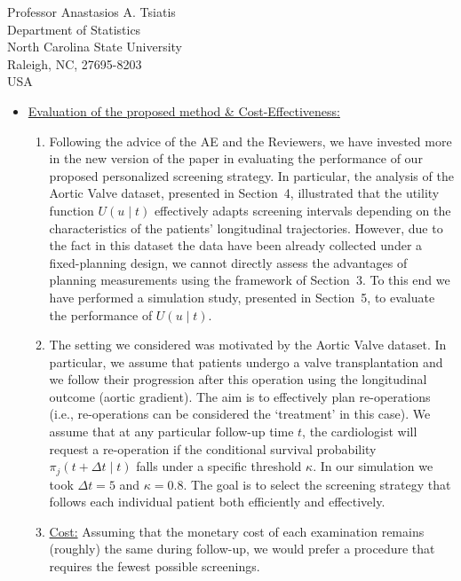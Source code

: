 \documentclass[a4paper, 11pt]{letter}
\begin{document}
\begin{letter}{Professor Anastasios A. Tsiatis\\
Department of Statistics\\
North Carolina State University\\
Raleigh, NC, 27695-8203\\
USA}
\begin{itemize}
\item \underline{Evaluation of the proposed method \& Cost-Effectiveness:}
    \begin{enumerate}
    \item Following the advice of the AE and the Reviewers, we have invested more in the new version of the paper in evaluating the performance of our proposed personalized screening strategy. In particular, the analysis of the Aortic Valve dataset, presented in Section~4, illustrated that the utility function $U(u \mid t)$ effectively adapts screening intervals depending on the characteristics of the patients' longitudinal trajectories. However, due to the fact in this dataset the data have been already collected under a fixed-planning design, we cannot directly assess the advantages of planning measurements using the framework of Section~3. To this end we have performed a simulation study, presented in Section~5, to evaluate the performance of $U(u \mid t)$.

    \item The setting we considered was motivated by the Aortic Valve dataset. In particular, we assume that patients undergo a valve transplantation and we follow their progression after this operation using the longitudinal outcome (aortic gradient). The aim is to effectively plan re-operations (i.e., re-operations can be considered the `treatment' in this case). We assume that at any particular follow-up time $t$, the cardiologist will request a re-operation if the conditional survival probability $\pi_j(t + \Delta t \mid t)$ falls under a specific threshold $\kappa$. In our simulation we took $\Delta t = 5$ and $\kappa = 0.8$. The goal is to select the screening strategy that follows each individual patient both efficiently and effectively.

    \item \underline{Cost:} Assuming that the monetary cost of each examination remains (roughly) the same during follow-up, we would prefer a procedure that requires the fewest possible screenings.


\end{enumerate}
\end{itemize}
\end{letter}
\end{document}
